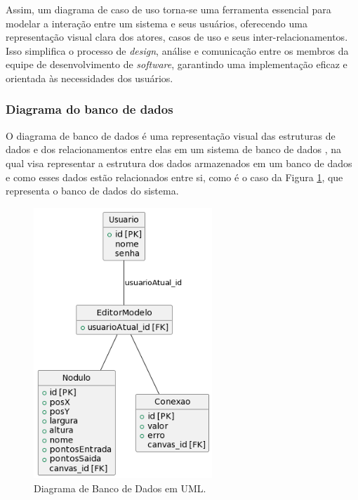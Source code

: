 Assim, um diagrama de caso de uso torna-se uma ferramenta essencial para modelar a interação entre um sistema e seus usuários, oferecendo uma representação visual clara dos atores, casos de uso e seus inter-relacionamentos. Isso simplifica o processo de \textit{design}, análise e comunicação entre os membros da equipe de desenvolvimento de \textit{software}, garantindo uma implementação eficaz e orientada às necessidades dos usuários.
        
\subsubsection{Diagrama do banco de dados}

O diagrama de banco de dados é uma representação visual das estruturas de dados e dos relacionamentos entre elas em um sistema de banco de dados \cite{databasedepth}, na qual visa representar a estrutura dos dados armazenados em um banco de dados e como esses dados estão relacionados entre si, como é o caso da Figura \ref{fig:DatabaseDiagram}, que representa o banco de dados do sistema.
            
\begin{figure}[htb]
    \caption{\label{fig:DatabaseDiagram}Diagrama de Banco de Dados em UML.}
    \begin{center}
        \includegraphics[width=0.6\textwidth]{figuras/DatabaseDiagram.png}
    \end{center}
\end{figure}
            
